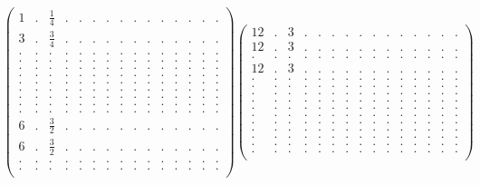 \documentclass[12pt,a4paper]{amsart}
\begin{document}
\begin{align*}
\left(\begin{array}{rrrrrrrrrrrrrrr}%
1&.&\frac14&.&.&.&.&.&.&.&.&.&.&.&.\\%
3&.&\frac34&.&.&.&.&.&.&.&.&.&.&.&.\\%
.&.&.&.&.&.&.&.&.&.&.&.&.&.&.\\%
.&.&.&.&.&.&.&.&.&.&.&.&.&.&.\\%
.&.&.&.&.&.&.&.&.&.&.&.&.&.&.\\%
.&.&.&.&.&.&.&.&.&.&.&.&.&.&.\\%
.&.&.&.&.&.&.&.&.&.&.&.&.&.&.\\%
.&.&.&.&.&.&.&.&.&.&.&.&.&.&.\\%
.&.&.&.&.&.&.&.&.&.&.&.&.&.&.\\%
.&.&.&.&.&.&.&.&.&.&.&.&.&.&.\\%
.&.&.&.&.&.&.&.&.&.&.&.&.&.&.\\%
6&.&\frac32&.&.&.&.&.&.&.&.&.&.&.&.\\%
6&.&\frac32&.&.&.&.&.&.&.&.&.&.&.&.\\%
.&.&.&.&.&.&.&.&.&.&.&.&.&.&.\\%
.&.&.&.&.&.&.&.&.&.&.&.&.&.&.\\%
\end{array}\right)%
\left(\begin{array}{rrrrrrrrrrrrrrr}%
12&.&3&.&.&.&.&.&.&.&.&.&.&.&.\\%
12&.&3&.&.&.&.&.&.&.&.&.&.&.&.\\%
.&.&.&.&.&.&.&.&.&.&.&.&.&.&.\\%
12&.&3&.&.&.&.&.&.&.&.&.&.&.&.\\%
.&.&.&.&.&.&.&.&.&.&.&.&.&.&.\\%
.&.&.&.&.&.&.&.&.&.&.&.&.&.&.\\%
.&.&.&.&.&.&.&.&.&.&.&.&.&.&.\\%
.&.&.&.&.&.&.&.&.&.&.&.&.&.&.\\%
.&.&.&.&.&.&.&.&.&.&.&.&.&.&.\\%
.&.&.&.&.&.&.&.&.&.&.&.&.&.&.\\%
.&.&.&.&.&.&.&.&.&.&.&.&.&.&.\\%
.&.&.&.&.&.&.&.&.&.&.&.&.&.&.\\%
.&.&.&.&.&.&.&.&.&.&.&.&.&.&.\\%
.&.&.&.&.&.&.&.&.&.&.&.&.&.&.\\%
.&.&.&.&.&.&.&.&.&.&.&.&.&.&.\\%
\end{array}\right)%
\end{align*}
\end{document}
